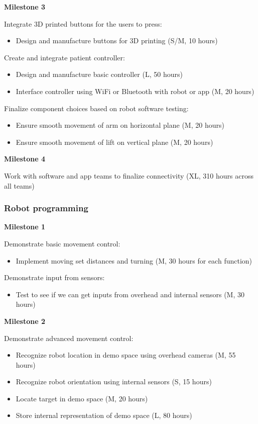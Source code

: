 \documentclass{article}
\begin{document}
{\bf Milestone 3}

Integrate 3D printed buttons for the users to press:
\begin{itemize}
\item Design and manufacture buttons for 3D printing (S/M, 10 hours)
\end{itemize}

Create and integrate patient controller:
\begin{itemize}
  \item Design and manufacture basic controller (L, 50 hours)
  \item Interface controller using WiFi or Bluetooth with robot or app (M, 20 hours)
\end{itemize}

Finalize component choices based on robot software testing:
\begin{itemize}
\item Ensure smooth movement of arm on horizontal plane (M, 20 hours)
\item Ensure smooth movement of lift on vertical plane (M, 20 hours)
\end{itemize}


{\bf Milestone 4}

Work with software and app teams to finalize connectivity (XL, 310 hours across all teams)


\subsubsection{Robot programming}

{\bf Milestone 1}

Demonstrate basic movement control:
\begin{itemize}
\item Implement moving set distances and turning (M, 30 hours for each function)
\end{itemize}

Demonstrate input from sensors:
\begin{itemize}
\item Test to see if we can get inputs from overhead and internal sensors (M, 30 hours)
\end{itemize}

{\bf Milestone 2}

Demonstrate advanced movement control:
\begin{itemize}
\item Recognize robot location in demo space using overhead cameras (M, 55 hours)
\item Recognize robot orientation using internal sensors (S, 15 hours)
\item Locate target in demo space (M, 20 hours)
\item Store internal representation of demo space (L, 80 hours)
\end{itemize}
\end{document}
